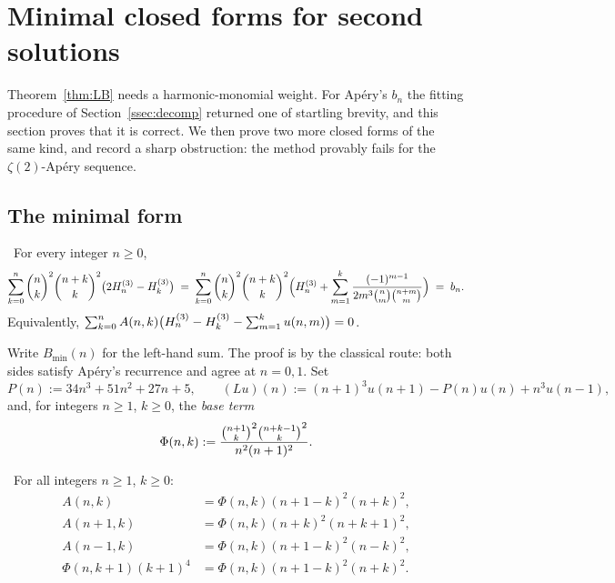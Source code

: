 \section{Minimal closed forms for second solutions}
\label{sec:minimal}

Theorem~\ref{thm:LB} needs a harmonic-monomial weight. For Ap\'ery's $b_n$ the fitting
procedure of Section~\ref{ssec:decomp} returned one of startling brevity, and this section
proves that it is correct. We then prove two more closed forms of the same kind, and
record a sharp obstruction: the method provably fails for the $\zeta(2)$-Ap\'ery
sequence.

\subsection{The minimal form}

\begin{theorem}\label{thm:minimal}
\Proved\ For every integer $n\ge0$,
\[
   \sum_{k=0}^{n}\binom{n}{k}^2\binom{n+k}{k}^2\bigl(2H^{(3)}_{n}-H^{(3)}_{k}\bigr)
   \;=\;
   \sum_{k=0}^{n}\binom{n}{k}^2\binom{n+k}{k}^2
     \Bigl(H^{(3)}_{n}+\sum_{m=1}^{k}\frac{(-1)^{m-1}}{2m^3\binom{n}{m}\binom{n+m}{m}}\Bigr)
   \;=\;b_n .
\]
Equivalently,
$\sum_{k=0}^{n}A(n,k)\bigl(H^{(3)}_{n}-H^{(3)}_{k}-\sum_{m=1}^ku(n,m)\bigr)=0$.
\end{theorem}

Write $B_{\min}(n)$ for the left-hand sum. The proof is by the classical route: both
sides satisfy Ap\'ery's recurrence and agree at $n=0,1$. Set
\begin{equation}\label{eq:Ldef}
   P(n):=34n^3+51n^2+27n+5,\qquad
   (Lu)(n):=(n+1)^3u(n+1)-P(n)u(n)+n^3u(n-1),
\end{equation}
and, for integers $n\ge1$, $k\ge0$, the \emph{base term}
\begin{equation}\label{eq:Phi}
   \Phi(n,k):=\frac{\binom{n+1}{k}^2\binom{n+k-1}{k}^2}{n^2(n+1)^2}.
\end{equation}

\begin{lemma}[conversion]\label{lem:conv}
\Proved\ For all integers $n\ge1$, $k\ge0$:
\begin{align}
   A(n,k)&=\Phi(n,k)(n+1-k)^2(n+k)^2, \tag{0a}\\
   A(n+1,k)&=\Phi(n,k)(n+k)^2(n+k+1)^2, \tag{0b}\\
   A(n-1,k)&=\Phi(n,k)(n+1-k)^2(n-k)^2, \tag{0c}\\
   \Phi(n,k+1)(k+1)^4&=\Phi(n,k)(n+1-k)^2(n+k)^2. \tag{0d}
\end{align}
\end{lemma}

